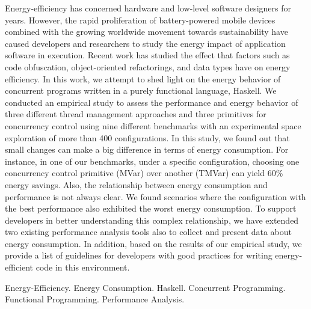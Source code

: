 \noindent
Energy-efficiency has concerned hardware and low-level software designers for years. However, the rapid proliferation of battery-powered mobile devices combined with the growing worldwide movement towards sustainability have caused developers and researchers to study the energy impact of application software in execution. Recent work has studied the effect that factors such as code obfuscation, object-oriented refactorings, and data types have on energy efficiency. In this work, we attempt to shed light on the energy behavior of concurrent programs written in a purely functional language, Haskell. %
We conducted an empirical study to assess the performance and energy behavior of three different thread management approaches and three primitives for concurrency control using nine different benchmarks with an experimental space exploration of more than 400 configurations. In this study, we found out that small changes can make a big difference in terms of energy consumption. For instance, in one of our benchmarks, under a specific configuration, choosing one concurrency control primitive (MVar) over another (TMVar) can yield 60\% energy savings. Also, the relationship between energy consumption and performance is not always clear. We found scenarios where the configuration with the best performance also exhibited the worst energy consumption. %
To support developers in better understanding this complex relationship, we have extended two existing performance analysis tools also to collect and present data about energy consumption. In addition, based on the results of our empirical study, we provide a list of guidelines for developers with good practices for writing energy-efficient code in this environment.

\begin{keywords}
Energy-Efficiency. Energy Consumption. Haskell. Concurrent Programming. Functional Programming. Performance Analysis.
\end{keywords}
